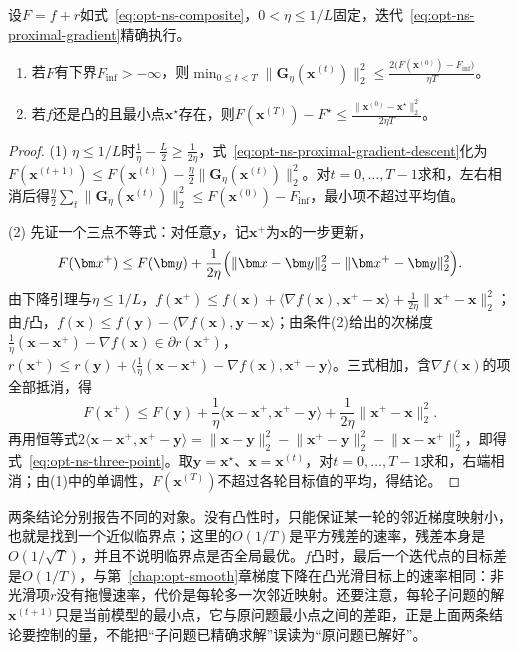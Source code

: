 \begin{theorem}[邻近梯度法的保证]
\label{thm:opt-ns-proximal-gradient}
设$F=f+r$如式~\eqref{eq:opt-ns-composite}，$0<\eta\leq1/L$固定，迭代~\eqref{eq:opt-ns-proximal-gradient}精确执行。
\begin{enumerate}
  \item 若$F$有下界$F_{\inf}>-\infty$，则$\displaystyle\min_{0\leq t<T}\lVert\bm G_\eta(\bm x^{(t)})\rVert_2^2\leq\frac{2\bigl(F(\bm x^{(0)})-F_{\inf}\bigr)}{\eta T}$。
  \item 若$f$还是凸的且最小点$\bm x^\star$存在，则$\displaystyle F(\bm x^{(T)})-F^\star\leq\frac{\lVert\bm x^{(0)}-\bm x^\star\rVert_2^2}{2\eta T}$。
\end{enumerate}
\end{theorem}

\begin{proof}
(1) $\eta\leq1/L$时$\frac1\eta-\frac L2\geq\frac1{2\eta}$，式~\eqref{eq:opt-ns-proximal-gradient-descent}化为$F(\bm x^{(t+1)})\leq F(\bm x^{(t)})-\frac\eta2\lVert\bm G_\eta(\bm x^{(t)})\rVert_2^2$。对$t=0,\dots,T-1$求和，左右相消后得$\frac\eta2\sum_t\lVert\bm G_\eta(\bm x^{(t)})\rVert_2^2\leq F(\bm x^{(0)})-F_{\inf}$，最小项不超过平均值。

(2) 先证一个三点不等式：对任意$\bm y$，记$\bm x^+$为$\bm x$的一步更新，
\begin{equation}
 F(\bm x^+)\leq F(\bm y)+\frac1{2\eta}\Bigl(\lVert\bm x-\bm y\rVert_2^2-\lVert\bm x^+-\bm y\rVert_2^2\Bigr).
 \label{eq:opt-ns-three-point}
\end{equation}
由下降引理与$\eta\leq1/L$，$f(\bm x^+)\leq f(\bm x)+\langle\nabla f(\bm x),\bm x^+-\bm x\rangle+\frac1{2\eta}\lVert\bm x^+-\bm x\rVert_2^2$；由$f$凸，$f(\bm x)\leq f(\bm y)-\langle\nabla f(\bm x),\bm y-\bm x\rangle$；由条件(2)给出的次梯度$\frac1\eta(\bm x-\bm x^+)-\nabla f(\bm x)\in\partial r(\bm x^+)$，$r(\bm x^+)\leq r(\bm y)+\langle\frac1\eta(\bm x-\bm x^+)-\nabla f(\bm x),\bm x^+-\bm y\rangle$。三式相加，含$\nabla f(\bm x)$的项全部抵消，得
\[
 F(\bm x^+)\leq F(\bm y)+\frac1\eta\langle\bm x-\bm x^+,\bm x^+-\bm y\rangle+\frac1{2\eta}\lVert\bm x^+-\bm x\rVert_2^2 .
\]
再用恒等式$2\langle\bm x-\bm x^+,\bm x^+-\bm y\rangle=\lVert\bm x-\bm y\rVert_2^2-\lVert\bm x^+-\bm y\rVert_2^2-\lVert\bm x-\bm x^+\rVert_2^2$，即得式~\eqref{eq:opt-ns-three-point}。取$\bm y=\bm x^\star$、$\bm x=\bm x^{(t)}$，对$t=0,\dots,T-1$求和，右端相消；由(1)中的单调性，$F(\bm x^{(T)})$不超过各轮目标值的平均，得结论。
\end{proof}

两条结论分别报告不同的对象。没有凸性时，只能保证某一轮的邻近梯度映射小，也就是找到一个近似临界点；这里的$O(1/T)$是平方残差的速率，残差本身是$O(1/\sqrt T)$，并且不说明临界点是否全局最优。$f$凸时，最后一个迭代点的目标差是$O(1/T)$，与第~\ref{chap:opt-smooth}章梯度下降在凸光滑目标上的速率相同：非光滑项$r$没有拖慢速率，代价是每轮多一次邻近映射。还要注意，每轮子问题的解$\bm x^{(t+1)}$只是当前模型的最小点，它与原问题最小点之间的差距，正是上面两条结论要控制的量，不能把“子问题已精确求解”误读为“原问题已解好”。

